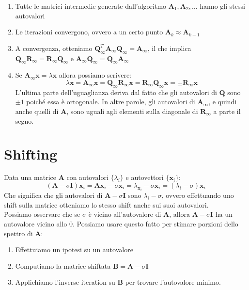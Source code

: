 \documentclass{article}
\begin{document}
            \begin{enumerate}
                \item Tutte le matrici intermedie generate dall'algoritmo $\mathbf{A}_1, \mathbf{A}_2, \dots$ hanno gli stessi autovalori
                \item Le iterazioni convergono, ovvero a un certo punto $\mathbf{A}_k \approx \mathbf{A}_{k-1}$
                \item A convergenza, otteniamo $\mathbf{Q}_\infty^T\mathbf{A}_\infty\mathbf{Q}_\infty = \mathbf{A}_\infty$, il che implica \\
                $\mathbf{Q}_{\infty}\mathbf{R}_\infty = \mathbf{R}_\infty \mathbf{Q}_\infty$ e $\mathbf{A}_\infty \mathbf{Q}_\infty = \mathbf{Q}_\infty \mathbf{A}_\infty$
                \item Se $\mathbf{A}_\infty \mathbf{x} = \lambda\mathbf{x}$ allora possiamo scrivere:
                    \[\lambda \mathbf{x} = \mathbf{A}_\infty\mathbf{x} = \mathbf{Q}_\infty \mathbf{R}_\infty \mathbf{x} = \mathbf{R}_\infty \mathbf{Q}_\infty \mathbf{x} = \pm\mathbf{R}_\infty \mathbf{x}\]
                    L'ultima parte dell'uguaglianza deriva dal fatto che gli autovalori di $\mathbf{Q}$ sono $\pm1$ poiché essa è ortogonale. 
                    In altre parole, gli autovalori di $\mathbf{A}_\infty$, e quindi anche quelli di $\mathbf{A}$, sono uguali agli elementi 
                    sulla diagonale di $\mathbf{R}_\infty$ a parte il segno. 
            \end{enumerate}
            
    \section{Shifting}
        Data una matrice $\mathbf{A}$ con autovalori $\{\lambda_i\}$ e autovettori $\{\mathbf{x}_i\}$:
        \[( \mathbf{A} - \sigma\mathbf{I})\mathbf{x}_i = \mathbf{Ax}_i - \sigma\mathbf{x}_i = \lambda_{\mathbf{x}_i} - \sigma\mathbf{x}_i = (\lambda_i - \sigma)\mathbf{x}_i\]
        Che significa che gli autovalori di $\mathbf{A} - \sigma\mathbf{I}$ sono $\lambda_i - \sigma$, ovvero effettuando 
        uno shift sulla matrice otteniamo lo stesso shift anche sui suoi autovalori. \\
        Possiamo osservare che se $\sigma$ è vicino all'autovalore di $\mathbf{A}$, allora $\mathbf{A} - \sigma\mathbf{I}$ ha 
        un autovalore vicino allo 0. Possiamo usare questo fatto per stimare porzioni dello spettro di $\mathbf{A}$:
        \begin{enumerate}
            \item Effettuiamo un ipotesi su un autovalore
            \item Computiamo la matrice shiftata $\mathbf{B} = \mathbf{A} - \sigma\mathbf{I}$
            \item Applichiamo l'inverse iteration su $\mathbf{B}$ per trovare l'autovalore minimo. 
        \end{enumerate}
\end{document}
